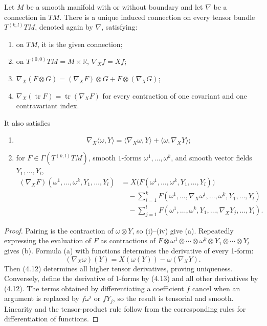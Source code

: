 \begin{proposition}
\label{prop:connection-on-tensor-bundles}
\leanok
Let $M$ be a smooth manifold with or without boundary and let $\nabla$ be a
connection in $TM$. There is a unique induced connection on every tensor
bundle $T^{(k,l)}TM$, denoted again by $\nabla$, satisfying:
\begin{enumerate}
\item[(i)] on $TM$, it is the given connection;
\item[(ii)] on $T^{(0,0)}TM=M\times\mathbb R$, $\nabla_Xf=Xf$;
\item[(iii)] $\nabla_X(F\otimes G)=(\nabla_XF)\otimes G+F\otimes(\nabla_XG)$;
\item[(iv)] $\nabla_X(\operatorname{tr}F)=\operatorname{tr}(\nabla_XF)$ for every
contraction of one covariant and one contravariant index.
\end{enumerate}
It also satisfies
\begin{enumerate}
\item[(a)]
\[
\nabla_X\langle\omega,Y\rangle
=\langle\nabla_X\omega,Y\rangle+\langle\omega,\nabla_XY\rangle;
\]
\item[(b)] for $F\in\Gamma(T^{(k,l)}TM)$, smooth $1$-forms
$\omega^1,\ldots,\omega^k$, and smooth vector fields $Y_1,\ldots,Y_l$,
\begin{align}
(\nabla_XF)(\omega^1,\ldots,\omega^k,Y_1,\ldots,Y_l)
&=X\big(F(\omega^1,\ldots,\omega^k,Y_1,\ldots,Y_l)\big)\nonumber\\
&\quad-\sum_{i=1}^kF(\omega^1,\ldots,\nabla_X\omega^i,\ldots,\omega^k,Y_1,\ldots,Y_l)\nonumber\\
&\quad-\sum_{j=1}^lF(\omega^1,\ldots,\omega^k,Y_1,\ldots,\nabla_XY_j,\ldots,Y_l).
\label{eq:4.12}\tag{4.12}
\end{align}
\end{enumerate}
\end{proposition}
\begin{proof}
\leanok
\sketch Pairing is the contraction of $\omega\otimes Y$, so (i)--(iv) give
(a). Repeatedly expressing the evaluation of $F$ as contractions of
$F\otimes\omega^1\otimes\cdots\otimes\omega^k\otimes Y_1\otimes\cdots\otimes
Y_l$ gives (b). Formula (a) with functions determines the derivative of every
1-form:
\begin{equation}
(\nabla_X\omega)(Y)=X(\omega(Y))-\omega(\nabla_XY).
\label{eq:4.13}\tag{4.13}
\end{equation}
Then (4.12) determines all higher tensor derivatives, proving uniqueness.
Conversely, define the derivative of $1$-forms by (4.13) and all other
derivatives by (4.12). The terms obtained by differentiating a coefficient
$f$ cancel when an argument is replaced by $f\omega^i$ or $fY_j$, so the
result is tensorial and smooth. Linearity and the tensor-product rule follow
from the corresponding rules for differentiation of functions.
\end{proof}

